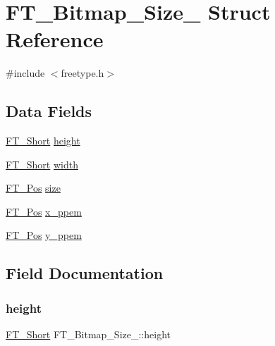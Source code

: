 \hypertarget{struct_f_t___bitmap___size__}{}\section{F\+T\+\_\+\+Bitmap\+\_\+\+Size\+\_\+ Struct Reference}
\label{struct_f_t___bitmap___size__}


{\ttfamily \#include $<$freetype.\+h$>$}

\subsection*{Data Fields}
\begin{DoxyCompactItemize}
\item 
\hyperlink{fttypes_8h_aa7279be89046a2563cd3d4d6651fbdcf}{F\+T\+\_\+\+Short} \hyperlink{struct_f_t___bitmap___size___adf2f24039b458ff4674712886f242262}{height}
\item 
\hyperlink{fttypes_8h_aa7279be89046a2563cd3d4d6651fbdcf}{F\+T\+\_\+\+Short} \hyperlink{struct_f_t___bitmap___size___ab9da94223f75a89a649d1e6d018b17f1}{width}
\item 
\hyperlink{ftimage_8h_af5f230f4b253d4c7715fd2e595614c90}{F\+T\+\_\+\+Pos} \hyperlink{struct_f_t___bitmap___size___a1db23a6220fb6bcb712430821a6e5352}{size}
\item 
\hyperlink{ftimage_8h_af5f230f4b253d4c7715fd2e595614c90}{F\+T\+\_\+\+Pos} \hyperlink{struct_f_t___bitmap___size___a6f877a792d2dc93328037c928979215f}{x\+\_\+ppem}
\item 
\hyperlink{ftimage_8h_af5f230f4b253d4c7715fd2e595614c90}{F\+T\+\_\+\+Pos} \hyperlink{struct_f_t___bitmap___size___a60d4d003d09fd57505f69f39e31e19c1}{y\+\_\+ppem}
\end{DoxyCompactItemize}


\subsection{Field Documentation}
\mbox{\label{struct_f_t___bitmap___size___adf2f24039b458ff4674712886f242262}} 
\subsubsection{\texorpdfstring{height}{height}}
{\footnotesize\ttfamily \hyperlink{fttypes_8h_aa7279be89046a2563cd3d4d6651fbdcf}{F\+T\+\_\+\+Short} F\+T\+\_\+\+Bitmap\+\_\+\+Size\+\_\+\+::height}

